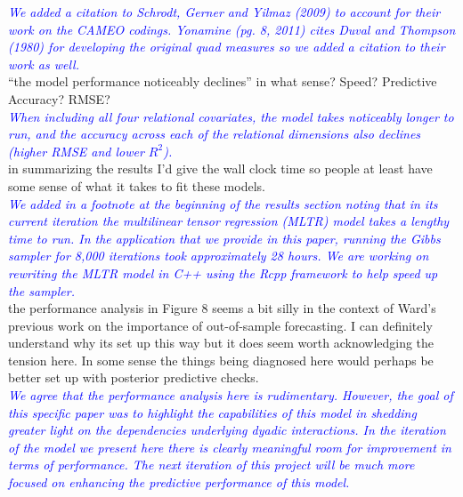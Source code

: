 \textcolor{blue}{\emph{
	We added a citation to Schrodt, Gerner and Yilmaz (2009) to account for their work on the CAMEO codings. Yonamine (pg. 8, 2011) cites Duval and Thompson (1980) for developing the original quad measures so we added a citation to their work as well.
}} \\

``the model performance noticeably declines'' in what sense? Speed? Predictive Accuracy? RMSE? \\

\textcolor{blue}{\emph{
	When including all four relational covariates, the model takes noticeably longer to run, and the accuracy across each of the relational dimensions also declines (higher RMSE and lower $R^2$). 
}} \\

in summarizing the results I'd give the wall clock time so people at least have some sense of what it takes to fit these models. \\

\textcolor{blue}{\emph{
	We added in a footnote at the beginning of the results section noting that in its current iteration the multilinear tensor regression (MLTR) model takes a lengthy time to run. In the application that we provide in this paper, running the Gibbs sampler for 8,000 iterations took approximately 28 hours. We are working on rewriting the MLTR model in C++ using the Rcpp framework to help speed up the sampler.
}} \\

the performance analysis in Figure 8 seems a bit silly in the context of Ward's previous work on the importance of out-of-sample forecasting. I can definitely understand why its set up this way but it does seem worth acknowledging the tension here. In some sense the things being diagnosed here would perhaps be better set up with posterior predictive checks. \\

\textcolor{blue}{\emph{
	We agree that the performance analysis here is rudimentary. However, the goal of this specific paper was to highlight the capabilities of this model in shedding greater light on the dependencies underlying dyadic interactions. In the iteration of the model we present here there is clearly meaningful room for improvement in terms of performance. The next iteration of this project will be much more focused on enhancing the predictive performance of this model.
}} \\


